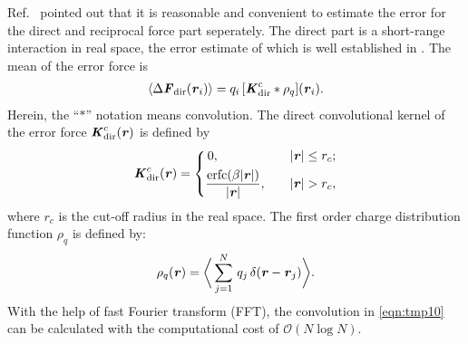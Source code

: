 \documentclass[aps,pre,preprint]{revtex4-1}
\renewcommand{\v}[1]{\textbf{\textit{#1}}}
\begin{document}
Ref.~\cite{wang2010optimizing} pointed out that it
is reasonable and convenient to estimate the error for the direct and
reciprocal force part seperately. 
The direct part is a short-range
interaction in real space, the error estimate of which
is well established in \cite{short}.
The mean of the error force is
\begin{align}\label{eqn:tmp10}
  \langle\Delta\v F_{\textrm{dir}}(\v r_i)\rangle
  =q_i\, [\v K^c_{\textrm{dir}}\ast\rho_q](\v r_i).
\end{align}
Herein, the ``$\ast$'' notation means convolution.  The direct
convolutional kernel of the error force $\v K^c_{\textrm{dir}}(\v r)$
is defined by
\begin{align}
  \v K^c_{\textrm{dir}}(\v r) =
  \left\{
    \begin{aligned}
      &\,0, &\quad & \vert\v r\vert \leq r_c;\\
      &\frac{\textrm{erfc}(\beta\vert\v r\vert)}{\vert\v r\vert},& & \vert\v r\vert > r_c,
    \end{aligned}
  \right.
\end{align}
where $r_c$ is the cut-off radius in the real space.  The first order
charge distribution function $\rho_q$ is defined by:
\begin{align}
  \rho_q(\v r) = 
  \bigg\langle
  \sum_{j = 1}^N
  \,q_j\,\delta(\v r - \v r_j)
  \bigg\rangle.
\end{align}
With the help of fast Fourier transform (FFT), the convolution in
\eqref{eqn:tmp10} can be calculated with the computational cost of
$\mathcal O(N\log N)$.
\end{document}
